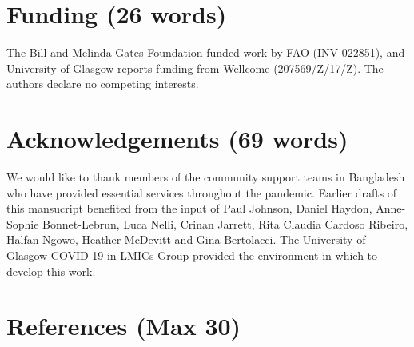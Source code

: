 \documentclass[]{elsarticle} %
\begin{document}
\hypertarget{funding-26-words}{%
\section{Funding (26 words)}\label{funding-26-words}}

The Bill and Melinda Gates Foundation funded work by FAO (INV-022851), and University of Glasgow reports funding from Wellcome (207569/Z/17/Z).
The authors declare no competing interests.

\hypertarget{acknowledgements-69-words}{%
\section{Acknowledgements (69 words)}\label{acknowledgements-69-words}}

We would like to thank members of the community support teams in Bangladesh who have provided essential services throughout the pandemic.
Earlier drafts of this mansucript benefited from the input of Paul Johnson, Daniel Haydon, Anne-Sophie Bonnet-Lebrun, Luca Nelli, Crinan Jarrett, Rita Claudia Cardoso Ribeiro, Halfan Ngowo, Heather McDevitt and Gina Bertolacci.
The University of Glasgow COVID-19 in LMICs Group provided the environment in which to develop this work.

\hypertarget{references-max-30}{%
\section*{References (Max 30)}\label{references-max-30}}
\end{document}

